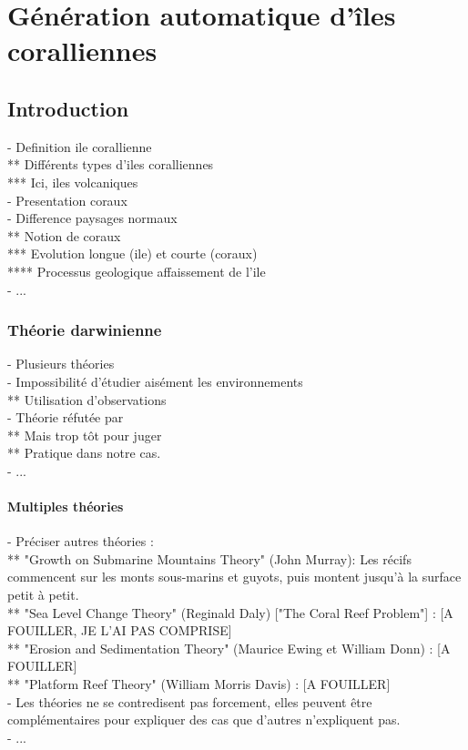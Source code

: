 \chapter{Génération automatique d'îles coralliennes}
\label{chap:coral-island}
\minitoc

\section{Introduction}
\label{sec:coral-island_introduction}
- Definition ile corallienne \\
** Différents types d'iles coralliennes \\
*** Ici, iles volcaniques \\
- Presentation coraux \\
- Difference paysages normaux \\
** Notion de coraux \\
*** Evolution longue (ile) et courte (coraux) \\
**** Processus geologique affaissement de l'ile \\
- ...

\subsection{Théorie darwinienne}
- Plusieurs théories \\
- Impossibilité d'étudier aisément les environnements \\
** Utilisation d'observations \\
- Théorie réfutée par \cite{Droxler2021} \\
** Mais trop tôt pour juger \\
** Pratique dans notre cas. \\
- ...

\subsubsection{Multiples théories}
- Préciser autres théories : \\
** "Growth on Submarine Mountains Theory" (John Murray): Les récifs commencent sur les monts sous-marins et guyots, puis montent jusqu'à la surface petit à petit. \\
** "Sea Level Change Theory" (Reginald Daly) ["The Coral Reef Problem"] \cite{Daly1915}  : [A FOUILLER, JE L'AI PAS COMPRISE] \\
** "Erosion and Sedimentation Theory" (Maurice Ewing et William Donn) : [A FOUILLER] \\
** "Platform Reef Theory" (William Morris Davis) : [A FOUILLER] \\
- Les théories ne se contredisent pas forcement, elles peuvent être complémentaires pour expliquer des cas que d'autres n'expliquent pas. \\
- ...

